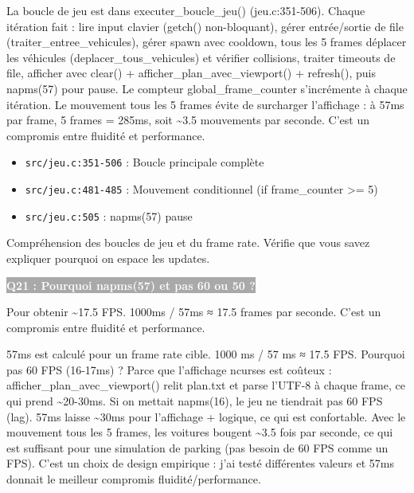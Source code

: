 \documentclass[12pt,a4paper]{article}
\newcommand{\question}[1]{%
    \vspace{0.5cm}
    \noindent\colorbox{darkgray}{\textcolor{white}{\textbf{#1}}}
    \vspace{0.3cm}
}
\begin{document}
\begin{reponse_longue}
La boucle de jeu est dans executer\_boucle\_jeu() (jeu.c:351-506). Chaque itération fait : lire input clavier (getch() non-bloquant), gérer entrée/sortie de file (traiter\_entree\_vehicules), gérer spawn avec cooldown, tous les 5 frames déplacer les véhicules (deplacer\_tous\_vehicules) et vérifier collisions, traiter timeouts de file, afficher avec clear() + afficher\_plan\_avec\_viewport() + refresh(), puis napms(57) pour pause. Le compteur global\_frame\_counter s'incrémente à chaque itération. Le mouvement tous les 5 frames évite de surcharger l'affichage : à 57ms par frame, 5 frames = 285ms, soit \textasciitilde{}3.5 mouvements par seconde. C'est un compromis entre fluidité et performance.
\end{reponse_longue}

\begin{reference_code}
\begin{itemize}
    \item \texttt{src/jeu.c:351-506} : Boucle principale complète
    \item \texttt{src/jeu.c:481-485} : Mouvement conditionnel (if frame\_counter >= 5)
    \item \texttt{src/jeu.c:505} : napms(57) pause
\end{itemize}
\end{reference_code}

\begin{objectif_prof}
Compréhension des boucles de jeu et du frame rate. Vérifie que vous savez expliquer pourquoi on espace les updates.
\end{objectif_prof}

\question{Q21 : Pourquoi napms(57) et pas 60 ou 50 ?}

\begin{reponse_courte}
Pour obtenir \textasciitilde{}17.5 FPS. 1000ms / 57ms ≈ 17.5 frames par seconde. C'est un compromis entre fluidité et performance.
\end{reponse_courte}

\begin{reponse_longue}
57ms est calculé pour un frame rate cible. 1000 ms / 57 ms ≈ 17.5 FPS. Pourquoi pas 60 FPS (16-17ms) ? Parce que l'affichage ncurses est coûteux : afficher\_plan\_avec\_viewport() relit plan.txt et parse l'UTF-8 à chaque frame, ce qui prend \textasciitilde{}20-30ms. Si on mettait napms(16), le jeu ne tiendrait pas 60 FPS (lag). 57ms laisse \textasciitilde{}30ms pour l'affichage + logique, ce qui est confortable. Avec le mouvement tous les 5 frames, les voitures bougent \textasciitilde{}3.5 fois par seconde, ce qui est suffisant pour une simulation de parking (pas besoin de 60 FPS comme un FPS). C'est un choix de design empirique : j'ai testé différentes valeurs et 57ms donnait le meilleur compromis fluidité/performance.
\end{reponse_longue}
\end{document}
